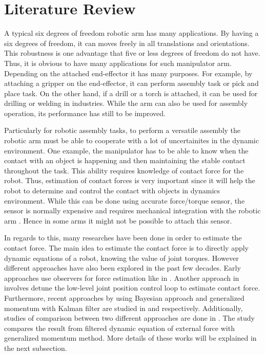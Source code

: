 \chapter{Literature Review}

A typical six degrees of freedom robotic arm has many applications. By having a six degrees of freedom, it can moves freely in all translations and orientations. This robustness is one advantage that five or less degrees of freedom do not have. Thus, it is obvious to have many applications for such manipulator arm. Depending on the attached end-effector it has many purposes. For example, by attaching a gripper on the end-effector, it can perform assembly task or pick and place task. On the other hand, if a drill or a torch is attached, it can be used for drilling or welding in industries. While the arm can also be used for assembly operation, its performance has still to be improved. 

Particularly for robotic assembly tasks, to perform a versatile assembly the robotic arm must be able to cooperate with a lot of uncertainites in the dynamic environment. One example, the manipulator has to be able to know when the contact with an object is happening and then maintaining the stable contact throughout the task. This ability requires knowledge of contact force for the robot. Thus, estimation of contact forces is very important since it will help the robot to determine and control the contact with objects in dynamics environment. While this can be done using accurate force/torque sensor, the sensor is normally expensive and requires mechanical integration with the robotic arm \cite{Hao15}. Hence in some arms it might not be possible to attach this sensor.  
 
In regards to this, many researches have been done in order to estimate the contact force. The main idea to estimate the contact force is to directly apply dynamic equations of a robot, knowing the value of joint torques. However different approaches have also been explored in the past few decades. Early approaches use observers for force estimation like in \cite{Ohi91}. Another approach in \cite{Stolt12} involves detune the low-level joint position control loop to estimate contact force. Furthermore, recent approaches by using Bayesian approach and generalized momentum with Kalman filter are studied in \cite{Hao14} and \cite{Hao15} respectively. Additionally, studies of comparison between two different approaches are done in \cite{Beyl11}. The study compares the result from filtered dynamic equation of external force with generalized momentum method. More details of these works will be explained in the next subsection.


